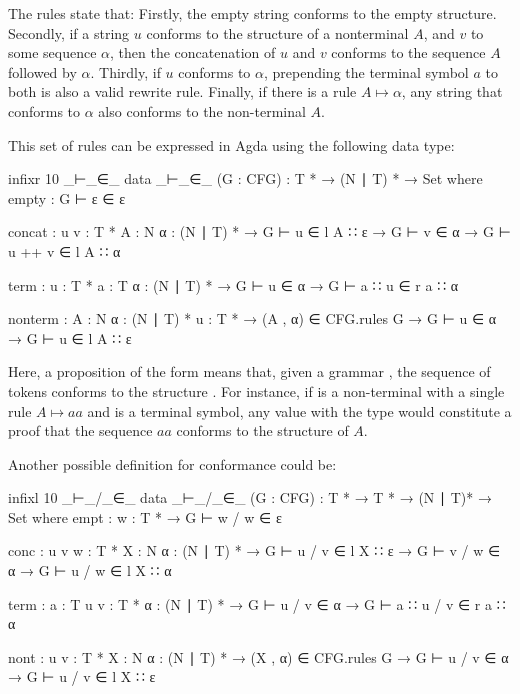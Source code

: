 	The rules state that: Firstly, the empty string conforms to the empty
	structure. Secondly, if a string $u$ conforms to the structure of a
	nonterminal $A$, and $v$ to some sequence $\alpha$, then the concatenation
	of $u$ and $v$ conforms to the sequence $A$ followed by $\alpha$. Thirdly,
	if $u$ conforms to $\alpha$, prepending the terminal symbol $a$ to both is
	also a valid rewrite rule. Finally, if there is a rule $A \mapsto \alpha$,
	any string that conforms to $\alpha$ also conforms to the non-terminal $A$.

	This set of rules can be expressed in Agda using the following data type:

	\begin{code}
		infixr 10 _⊢_∈_
		data _⊢_∈_ (G : CFG) :  T * → (N ∣ T) * → Set where
		  empty :
		    G ⊢ ε ∈ ε

		  concat : {u v : T *} {A : N} {α : (N ∣ T) *} →
		    G ⊢ u ∈ l A ∷ ε → G ⊢ v ∈ α → G ⊢ u ++ v ∈ l A ∷ α

		  term : {u : T *} {a : T} {α : (N ∣ T) *} →
		    G ⊢ u ∈ α → G ⊢ a ∷ u ∈ r a ∷ α

		  nonterm : {A : N} {α : (N ∣ T) *} {u : T *} →
		    (A , α) ∈ CFG.rules G → G ⊢ u ∈ α → G ⊢ u ∈ l A ∷ ε
	\end{code}

	Here, a proposition of the form  means that, given a
	grammar , the sequence of tokens  conforms to the
	structure . For instance, if  is a non-terminal with a
	single rule $A \mapsto aa$ and  is a terminal symbol, any value
	with the type  would constitute a proof
	that the sequence $aa$ conforms to the structure of $A$.

	Another possible definition for conformance could be:

	\begin{code}
		infixl 10 _⊢_/_∈_
		data _⊢_/_∈_ (G : CFG) : T * → T * → (N ∣ T)* → Set where
		  empt : {w : T *} →
		    G ⊢ w / w ∈ ε

		  conc : {u v w : T *} {X : N} {α : (N ∣ T) *} →
		    G ⊢ u / v ∈ l X ∷ ε →
		    G ⊢ v / w ∈ α →
		    G ⊢ u / w ∈ l X ∷ α

		  term : {a : T} {u v : T *} {α : (N ∣ T) *} →
		    G ⊢ u / v ∈ α →
		    G ⊢ a ∷ u / v ∈ r a ∷ α

		  nont : {u v : T *} {X : N} {α : (N ∣ T) *} →
		    (X , α) ∈ CFG.rules G →
		    G ⊢ u / v ∈ α →
		    G ⊢ u / v ∈ l X ∷ ε
	\end{code}

